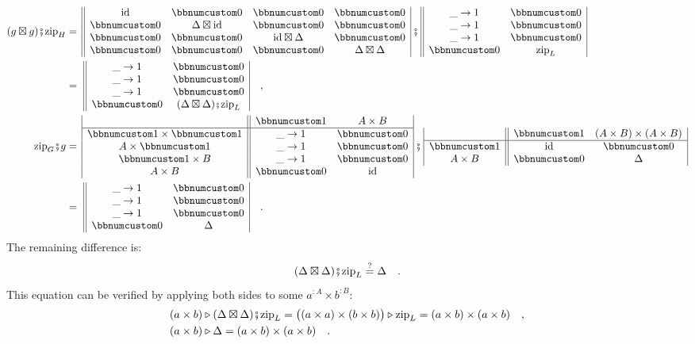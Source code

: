 \begin{align*}
(g\boxtimes g)\bef\text{zip}_{H} & =\,\begin{array}{||cccc|}
\text{id} & \bbnum 0 & \bbnum 0 & \bbnum 0\\
\bbnum 0 & \Delta\boxtimes\text{id} & \bbnum 0 & \bbnum 0\\
\bbnum 0 & \bbnum 0 & \text{id}\boxtimes\Delta & \bbnum 0\\
\bbnum 0 & \bbnum 0 & \bbnum 0 & \Delta\boxtimes\Delta
\end{array}\,\bef\,\begin{array}{||cc|}
\_\rightarrow1 & \bbnum 0\\
\_\rightarrow1 & \bbnum 0\\
\_\rightarrow1 & \bbnum 0\\
\bbnum 0 & \text{zip}_{L}
\end{array}\\
 & =\,\,\begin{array}{||cc|}
\_\rightarrow1 & \bbnum 0\\
\_\rightarrow1 & \bbnum 0\\
\_\rightarrow1 & \bbnum 0\\
\bbnum 0 & (\Delta\boxtimes\Delta)\bef\text{zip}_{L}
\end{array}\quad,\\
\text{zip}_{G}\bef g & =\,\begin{array}{|c||cc|}
 & \bbnum 1 & A\times B\\
\hline \bbnum 1\times\bbnum 1 & \_\rightarrow1 & \bbnum 0\\
A\times\bbnum 1 & \_\rightarrow1 & \bbnum 0\\
\bbnum 1\times B & \_\rightarrow1 & \bbnum 0\\
A\times B & \bbnum 0 & \text{id}
\end{array}\,\bef\,\begin{array}{|c||cc|}
 & \bbnum 1 & (A\times B)\times(A\times B)\\
\hline \bbnum 1 & \text{id} & \bbnum 0\\
A\times B & \bbnum 0 & \Delta
\end{array}\\
 & =\,\,\begin{array}{||cc|}
\_\rightarrow1 & \bbnum 0\\
\_\rightarrow1 & \bbnum 0\\
\_\rightarrow1 & \bbnum 0\\
\bbnum 0 & \Delta
\end{array}\quad.
\end{align*}
The remaining difference is:
\[
(\Delta\boxtimes\Delta)\bef\text{zip}_{L}\overset{?}{=}\Delta\quad.
\]
This equation can be verified by applying both sides to some $a^{:A}\times b^{:B}$:
\begin{align*}
 & (a\times b)\triangleright(\Delta\boxtimes\Delta)\bef\text{zip}_{L}=\big((a\times a)\times(b\times b)\big)\triangleright\text{zip}_{L}=(a\times b)\times(a\times b)\quad,\\
 & (a\times b)\triangleright\Delta=(a\times b)\times(a\times b)\quad.
\end{align*}

